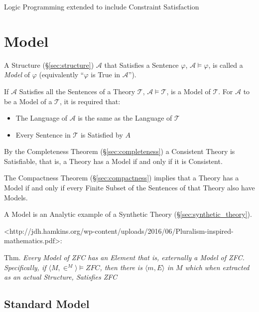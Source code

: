 Logic Programming extended to include Constraint Satisfaction



\section{Model}\label{sec:model}

A Structure (\S\ref{sec:structure}) $\mathcal{A}$ that Satisfies a
Sentence $\varphi$, $\mathcal{A} \models \varphi$, is called a
\emph{Model} of $\varphi$ (equivalently ``$\varphi$ is True in
$\mathcal{A}$'').

If $\mathcal{A}$ Satisfies all the Sentences of a Theory
$\mathcal{T}$, $\mathcal{A} \models \mathcal{T}$, is a Model of
$\mathcal{T}$. For $\mathcal{A}$ to be a Model of a $\mathcal{T}$, it
is required that:
\begin{itemize}
  \item The Language of $\mathcal{A}$ is the same as the Language of
    $\mathcal{T}$
  \item Every Sentence in $\mathcal{T}$ is Satisfied by $A$
\end{itemize}
By the Completeness Theorem (\S\ref{sec:completeness}) a Consistent
Theory is Satisfiable, that is, a Theory has a Model if and only if it
is Consistent.

The Compactness Theorem (\S\ref{sec:compactness}) implies that a
Theory has a Model if and only if every Finite Subset of the Sentences
of that Theory also have Models.

A Model is an Analytic example of a Synthetic Theory
(\S\ref{sec:synthetic_theory}). \cite{shulman15}


<http://jdh.hamkins.org/wp-content/uploads/2016/06/Pluralism-inspired-mathematics.pdf>:

Thm. \emph{Every Model of ZFC has an Element that is, externally a
  Model of ZFC. Specifically, if $\langle{M,\in^M}\rangle \vDash ZFC$,
then there is $\langle{m,E}\rangle$ in $M$ which when extracted as an
actual Structure, Satisfies ZFC}



\subsection{Standard Model}\label{sec:standard_model}

